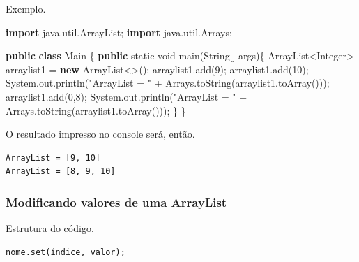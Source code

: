 \documentclass[
]{book}
\newenvironment{Shaded}{\begin{snugshade}}{\end{snugshade}}
\newcommand{\BuiltInTok}[1]{#1}
\newcommand{\DataTypeTok}[1]{\textcolor[rgb]{0.13,0.29,0.53}{#1}}
\newcommand{\DecValTok}[1]{\textcolor[rgb]{0.00,0.00,0.81}{#1}}
\newcommand{\FunctionTok}[1]{\textcolor[rgb]{0.00,0.00,0.00}{#1}}
\newcommand{\ImportTok}[1]{#1}
\newcommand{\KeywordTok}[1]{\textcolor[rgb]{0.13,0.29,0.53}{\textbf{#1}}}
\newcommand{\NormalTok}[1]{#1}
\newcommand{\StringTok}[1]{\textcolor[rgb]{0.31,0.60,0.02}{#1}}
\begin{document}
Exemplo.

\begin{Shaded}
\begin{Highlighting}[]
\KeywordTok{import}\ImportTok{ java.util.ArrayList;}
\KeywordTok{import}\ImportTok{ java.util.Arrays;}

\KeywordTok{public} \KeywordTok{class}\NormalTok{ Main \{}
    \KeywordTok{public} \DataTypeTok{static} \DataTypeTok{void} \FunctionTok{main}\NormalTok{(}\BuiltInTok{String}\NormalTok{[] args)\{}
        \BuiltInTok{ArrayList}\NormalTok{<}\BuiltInTok{Integer}\NormalTok{> arraylist1 = }\KeywordTok{new} \BuiltInTok{ArrayList}\NormalTok{<>();}
\NormalTok{        arraylist1.}\FunctionTok{add}\NormalTok{(}\DecValTok{9}\NormalTok{);}
\NormalTok{        arraylist1.}\FunctionTok{add}\NormalTok{(}\DecValTok{10}\NormalTok{);}
        \BuiltInTok{System}\NormalTok{.}\FunctionTok{out}\NormalTok{.}\FunctionTok{println}\NormalTok{(}\StringTok{"ArrayList = "}\NormalTok{ + }\BuiltInTok{Arrays}\NormalTok{.}\FunctionTok{toString}\NormalTok{(arraylist1.}\FunctionTok{toArray}\NormalTok{()));}
\NormalTok{        arraylist1.}\FunctionTok{add}\NormalTok{(}\DecValTok{0}\NormalTok{,}\DecValTok{8}\NormalTok{);}
        \BuiltInTok{System}\NormalTok{.}\FunctionTok{out}\NormalTok{.}\FunctionTok{println}\NormalTok{(}\StringTok{"ArrayList = "}\NormalTok{ + }\BuiltInTok{Arrays}\NormalTok{.}\FunctionTok{toString}\NormalTok{(arraylist1.}\FunctionTok{toArray}\NormalTok{()));}
\NormalTok{    \}}
\NormalTok{\}}
\end{Highlighting}
\end{Shaded}

O resultado impresso no console será, então.

\begin{verbatim}
ArrayList = [9, 10]
ArrayList = [8, 9, 10]
\end{verbatim}

\hypertarget{modificando-valores-de-uma-arraylist}{%
\subsubsection*{Modificando valores de uma ArrayList}\label{modificando-valores-de-uma-arraylist}}

Estrutura do código.

\begin{verbatim}
nome.set(índice, valor);
\end{verbatim}
\end{document}
